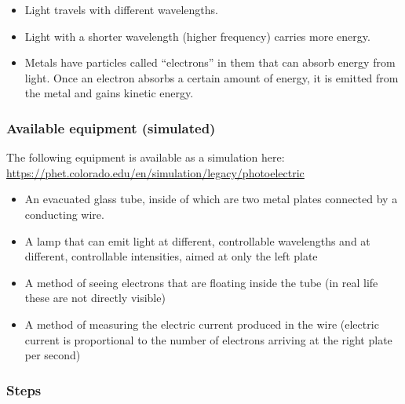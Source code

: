 \begin{itemize}
	\item Light travels with different wavelengths.
	
	\item Light with a shorter wavelength (higher frequency) carries more energy.
	
	\item Metals have particles called ``electrons'' in them that can absorb energy from light. Once an electron absorbs a certain amount of energy, it is emitted from the metal and gains kinetic energy.
\end{itemize}

\subsubsection{Available equipment (simulated)}

The following equipment is available as a simulation here: \url{https://phet.colorado.edu/en/simulation/legacy/photoelectric}

\begin{itemize}
	\item An evacuated glass tube, inside of which are two metal plates connected by a conducting wire.
	
	\item A lamp that can emit light at different, controllable wavelengths and at different, controllable intensities, aimed at only the left plate
	
	\item A method of seeing electrons that are floating inside the tube (in real life these are not directly visible)
	
	\item A method of measuring the electric current produced in the wire (electric current is proportional to the number of electrons arriving at the right plate per second)
\end{itemize}

\subsubsection{Steps}

